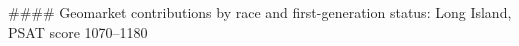 #### Geomarket contributions by race and first-generation status: Long Island, PSAT score 1070–1180
